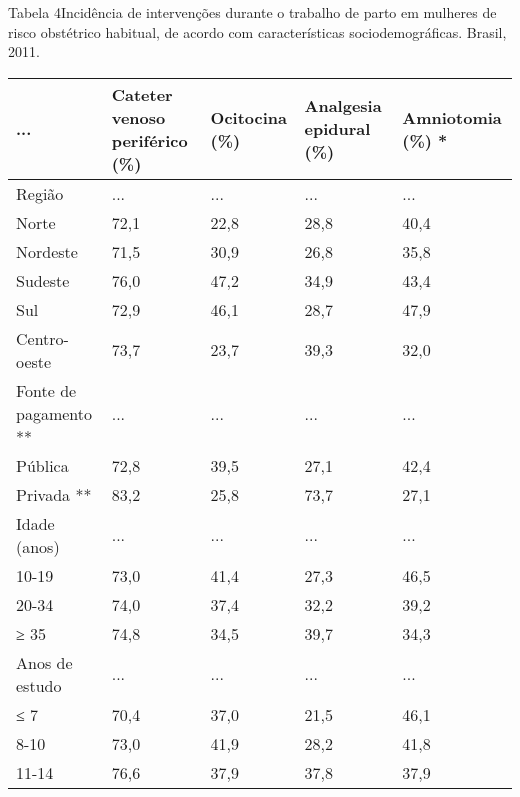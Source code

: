 \documentclass{article}
\begin{document}
Tabela 4Incidência de intervenções durante o trabalho de parto em mulheres de
risco obstétrico habitual, de acordo com características
sociodemográficas. Brasil, 2011.\begin{table}
\begin{adjustbox}{width=1.1\textwidth}
\small
\begin{xtabular}{ l l l l l }
\hline... & Cateter venoso periférico (\%) & Ocitocina (\%) & Analgesia epidural (\%)
& Amniotomia (\%) *\\ \hline
Região & ... & ... & ... & ...\\ \hline

Norte & 72,1 & 22,8 & 28,8 & 40,4\\ \hline

Nordeste & 71,5 & 30,9 & 26,8 & 35,8\\ \hline

Sudeste & 76,0 & 47,2 & 34,9 & 43,4\\ \hline

Sul & 72,9 & 46,1 & 28,7 & 47,9\\ \hline

Centro-oeste & 73,7 & 23,7 & 39,3 & 32,0\\ \hline

Fonte de pagamento ** & ... & ... & ... & ...\\ \hline

Pública & 72,8 & 39,5 & 27,1 & 42,4\\ \hline

Privada ** & 83,2 & 25,8 & 73,7 & 27,1\\ \hline

Idade (anos) & ... & ... & ... & ...\\ \hline

10-19 & 73,0 & 41,4 & 27,3 & 46,5\\ \hline

20-34 & 74,0 & 37,4 & 32,2 & 39,2\\ \hline

≥ 35 & 74,8 & 34,5 & 39,7 & 34,3\\ \hline

Anos de estudo & ... & ... & ... & ...\\ \hline

≤ 7 & 70,4 & 37,0 & 21,5 & 46,1\\ \hline

8-10 & 73,0 & 41,9 & 28,2 & 41,8\\ \hline

11-14 & 76,6 & 37,9 & 37,8 & 37,9\\ \hline


\end{xtabular}
\end{adjustbox}
\end{table}
\end{document}
